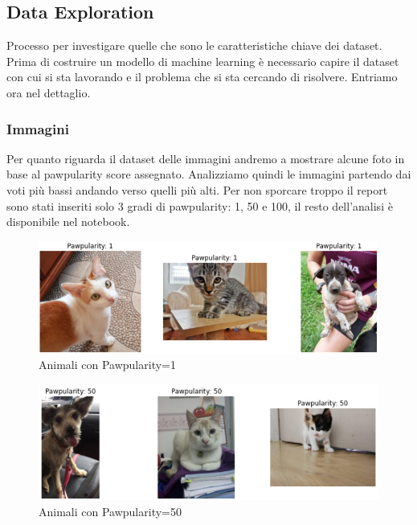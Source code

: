     
    \subsection{Data Exploration}
    Processo per investigare quelle che sono le caratteristiche chiave dei dataset. Prima di costruire un modello di machine learning è necessario capire il dataset con cui si sta lavorando e il problema che si sta cercando di risolvere. Entriamo ora nel dettaglio.

    \subsubsection{Immagini}
    Per quanto riguarda il dataset delle immagini andremo a mostrare alcune foto in base al pawpularity score assegnato.
    Analizziamo quindi le immagini partendo dai voti più bassi andando verso quelli più alti. Per non sporcare troppo il report sono stati inseriti solo 3 gradi di pawpularity: 1, 50 e 100, il resto dell'analisi è disponibile nel notebook.
    \begin{figure}[H]
        \centering
        \includegraphics[scale=0.5]{Plot/pawpularity_1.jpg}
        \caption{Animali con Pawpularity=1}
        \label{fig:paw_10}
    \end{figure}

    \begin{figure}[H]
        \centering
        \includegraphics[scale=0.5]{Plot/pawpularity_50.jpg}
        \caption{Animali con Pawpularity=50}
        \label{fig:paw_50}
    \end{figure}


